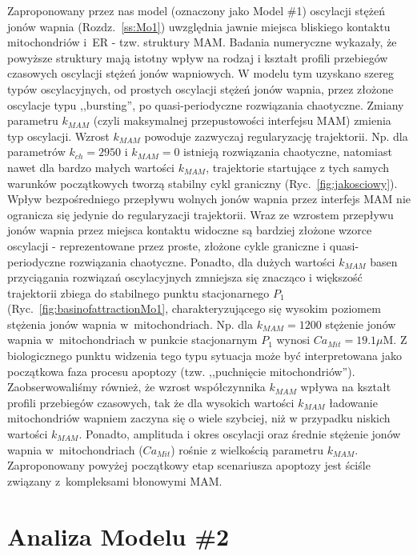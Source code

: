 Zaproponowany przez nas model (oznaczony jako Model \#1) oscylacji stężeń jonów wapnia (Rozdz.~\ref{ss:Mo1}) uwzględnia jawnie miejsca bliskiego kontaktu mitochondriów i~ER - tzw. struktury MAM. Badania numeryczne wykazały, że   powyższe struktury mają istotny wpływ na rodzaj i kształt profili przebiegów czasowych oscylacji stężeń jonów wapniowych. W modelu tym uzyskano szereg typów oscylacyjnych, od prostych oscylacji stężeń jonów wapnia, przez złożone oscylacje typu ,,bursting'', po quasi-periodyczne rozwiązania chaotyczne. Zmiany parametru $k_{MAM}$ (czyli maksymalnej przepustowości interfejsu MAM) zmienia typ oscylacji. Wzrost $k_{MAM}$ powoduje zazwyczaj regularyzację trajektorii. Np. dla parametrów $k_{ch} = 2950$ i $k_{MAM} = 0$ istnieją rozwiązania chaotyczne, natomiast nawet dla bardzo małych wartości $k_{MAM}$, trajektorie startujące z tych samych warunków początkowych tworzą stabilny cykl graniczny (Ryc.~\ref{fig:jakosciowy}). Wpływ bezpośredniego przepływu wolnych jonów wapnia przez interfejs MAM  nie ogranicza się jedynie do regularyzacji trajektorii. Wraz ze wzrostem przepływu jonów wapnia przez miejsca kontaktu widoczne są bardziej złożone wzorce oscylacji  - reprezentowane przez proste, złożone cykle graniczne i quasi-periodyczne rozwiązania chaotyczne. Ponadto, dla dużych wartości $k_{MAM}$ basen przyciągania rozwiązań oscylacyjnych zmniejsza się znacząco i większość trajektorii zbiega do stabilnego punktu stacjonarnego $P_1$ (Ryc.~\ref{fig:basinofattractionMo1}, charakteryzującego się wysokim poziomem stężenia jonów wapnia w~mitochondriach. Np. dla $k_{MAM} = 1200$ stężenie jonów wapnia w~mitochondriach w punkcie stacjonarnym $P_1$ wynosi $Ca_{Mit} = 19.1 \mu$M. Z biologicznego punktu widzenia tego typu sytuacja może być interpretowana jako początkowa faza procesu apoptozy (tzw. ,,puchnięcie mitochondriów''). Zaobserwowaliśmy również, że wzrost współczynnika $k_{MAM}$ wpływa na kształt profili przebiegów czasowych, tak że dla wysokich wartości $k_{MAM}$ ładowanie mitochondriów wapniem zaczyna się o wiele szybciej, niż w przypadku niskich wartości $k_{MAM}$. Ponadto, amplituda i okres oscylacji oraz średnie stężenie jonów wapnia w~mitochondriach ($Ca_{Mit}$) rośnie z wielkością parametru $k_{MAM}$. Zaproponowany powyżej początkowy etap scenariusza apoptozy jest ściśle związany z~kompleksami błonowymi MAM.


\FloatBarrier
\section{Analiza Modelu \#2}
\label{AnMo2}

